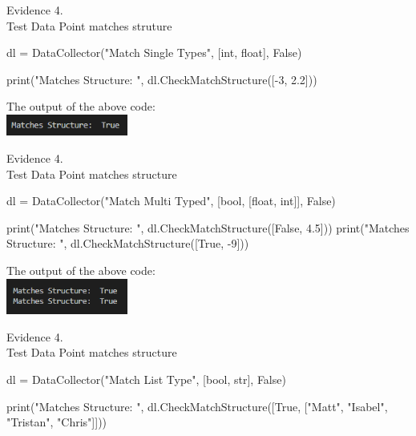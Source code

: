 \begin{center}
    {\large Evidence 4.\rn } \\ 
    \vspace{0.3cm}
    Test Data Point matches struture \\

    \begin{pythoncode}
dl = DataCollector("Match Single Types", [int, float], False)

print("Matches Structure: ", dl.CheckMatchStructure([-3, 2.2]))
    \end{pythoncode}

    The output of the above code: \\
    \includegraphics[width=4cm]{Images/Testing/T4.3.1.PNG} \\
    \vspace{1cm}

    {\large Evidence 4.\rn } \\ 
    \vspace{0.3cm}
    Test Data Point matches structure \\

    \begin{pythoncode}
dl = DataCollector("Match Multi Typed", [bool, [float, int]], False)

print("Matches Structure: ", dl.CheckMatchStructure([False, 4.5]))
print("Matches Structure: ", dl.CheckMatchStructure([True, -9]))
    \end{pythoncode}
        
    The output of the above code: \\
    \includegraphics[width=4cm]{Images/Testing/T4.4.1.PNG} \\
    \vspace{1cm}

    {\large Evidence 4.\rn } \\ 
    \vspace{0.3cm}
    Test Data Point matches structure \\

    \begin{pythoncode}
dl = DataCollector("Match List Type", [bool, str], False)

print("Matches Structure: ", dl.CheckMatchStructure([True, ["Matt", "Isabel", "Tristan", "Chris"]]))
    \end{pythoncode}
                    

\end{center}
